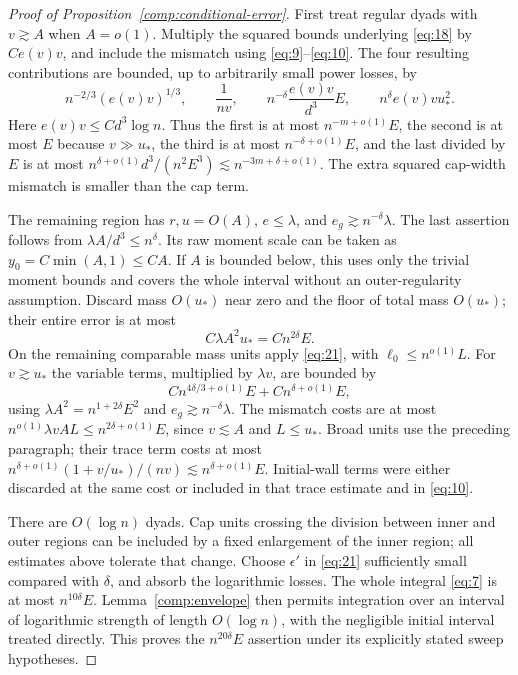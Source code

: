 \begin{proof}[Proof of Proposition~\ref{comp:conditional-error}]
First treat regular dyads with $v\gtrsim A$ when $A=o(1)$.
Multiply the squared bounds underlying \eqref{eq:18} by $Ce(v)v$,
and include the mismatch using \eqref{eq:9}--\eqref{eq:10}.
The four resulting contributions are bounded, up to arbitrarily small
power losses, by
\[
 n^{-2/3}(e(v)v)^{1/3},\qquad \frac1{nv},\qquad
 n^{-\delta}\frac{e(v)v}{d^3}E,\qquad
 n^\delta e(v)v u_*^2.
\]
Here $e(v)v\le Cd^3\log n$.  Thus the first is at most
$n^{-m+o(1)}E$, the second is at most $E$ because $v\gg u_*$,
the third is at most $n^{-\delta+o(1)}E$, and the last divided by
$E$ is at most
$n^{\delta+o(1)}d^3/(n^2E^3)\lesssim n^{-3m+\delta+o(1)}$.
The extra squared cap-width mismatch is smaller than the cap term.

The remaining region has $r,u=O(A)$, $e\le\lambda$, and
$e_g\gtrsim n^{-\delta}\lambda$.  The last assertion follows from
$\lambda A/d^3\le n^\delta$.  Its raw moment scale can be taken
as $y_0=C\min(A,1)\le CA$.  If $A$ is bounded below, this uses only
the trivial moment bounds and covers the whole interval without an
outer-regularity assumption.  Discard mass $O(u_*)$ near zero and the
floor of total mass $O(u_*)$; their entire error is at most
\[
 C\lambda A^2u_*=Cn^{2\delta}E.
\]
On the remaining comparable mass units apply \eqref{eq:21}, with
$\ell_0\le n^{o(1)}L$.  For $v\gtrsim u_*$ the variable terms,
multiplied by $\lambda v$, are bounded by
\[
 Cn^{4\delta/3+o(1)}E+Cn^{\delta+o(1)}E,
\]
using $\lambda A^2=n^{1+2\delta}E^2$ and
$e_g\gtrsim n^{-\delta}\lambda$.  The mismatch costs are at most
$n^{o(1)}\lambda vAL\le n^{2\delta+o(1)}E$, since $v\lesssim A$
and $L\le u_*$.  Broad units use the preceding paragraph; their
trace term costs at most
$n^{\delta+o(1)}(1+v/u_*)/(nv)\lesssim n^{\delta+o(1)}E$.
Initial-wall terms were either discarded at the same cost or included
in that trace estimate and in \eqref{eq:10}.

There are $O(\log n)$ dyads.  Cap units crossing the division between
inner and outer regions can be included by a fixed enlargement of the
inner region; all estimates above tolerate that change.  Choose
$\epsilon'$ in \eqref{eq:21} sufficiently small compared with
$\delta$, and absorb the logarithmic losses.  The whole integral
\eqref{eq:7} is at most $n^{10\delta}E$.
Lemma~\ref{comp:envelope} then permits integration over an interval
of logarithmic strength of length $O(\log n)$, with the negligible
initial interval treated directly.  This proves the $n^{20\delta}E$
assertion under its explicitly stated sweep hypotheses.
\end{proof}

